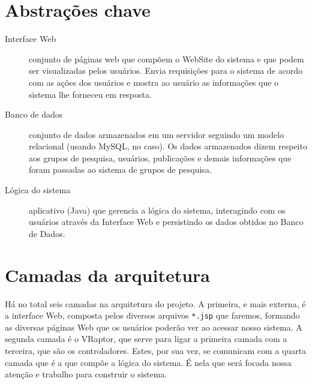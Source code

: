 \documentclass[11pt, a4paper]{article}
\begin{document}
    \section{Abstrações chave}
        \begin{description}
            \item[Interface Web] conjunto de páginas web que compõem o WebSite
            do sistema e que podem ser visualizadas pelos usuários. Envia
            requisições para o sistema de acordo com as ações dos usuários e
            mostra ao usuário as informações que o sistema lhe forneceu em
            resposta.

            \item[Banco de dados] conjunto de dados armazenados em um servidor
            seguindo um modelo relacional (usando MySQL, no caso). Os dados
            armazenados dizem respeito aos grupos de pesquisa, usuários,
            publicações e demais informações que foram passadas ao sistema de
            grupos de pesquisa.

            \item[Lógica do sistema] aplicativo (Java) que gerencia a lógica do
            sistema, interagindo com os usuários através da Interface Web e
            persistindo os dados obtidos no Banco de Dados.
        \end{description}

    \section{Camadas da arquitetura}
        Há no total seis camadas na arquitetura do projeto. A primeira, e mais
        externa, é a interface Web, composta pelos diversos arquivos
        \texttt{*.jsp} que faremos, formando as diversas páginas Web que os
        usuários poderão ver ao acessar nosso sistema.
        A segunda camada é o VRaptor, que serve para ligar a primeira camada com
        a terceira, que são os controladores. Estes, por sua vez, se comunicam
        com a quarta camada que é a que compõe a lógica do sistema. É nela que
        será focada nossa atenção e trabalho para construir o sistema.
\end{document}
